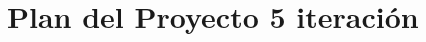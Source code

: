 \documentclass[12pt]{report}
\numberwithin{equation}{section}
\begin{document}
\pagestyle{fancy}
\renewcommand{\chaptermark}[1]{\markboth{\MakeUppercase{\chaptername}\ \thechapter.\ #1}{}}
\renewcommand{\headrulewidth}{0.2pt} 

\newcommand{\plan}{Plan del Proyecto}
\newcommand{\iso}{ISO/IEC 29110 Perfil B\'asico}
\newcommand{\isoP}{ISO/IEC 29110 Perfil B\'asico }
\newcommand{\planE}{Plan del Proyecto }
\newcommand{\implementacion}{Implementaci\'on de Software}
\newcommand{\reporte}{Reporte de seguimiento }



\setcounter{page}{26}


\newpage


\centering\section{Plan del Proyecto 5 iteraci\'on}\label{Plan del Proyecto5}
%
%
%
\end{document}
